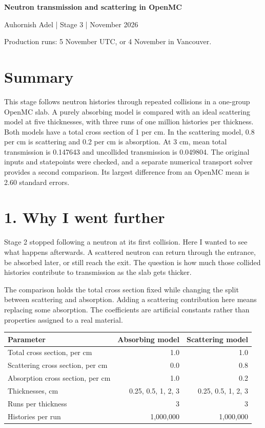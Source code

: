 \documentclass[10pt,letterpaper]{article}
\begin{document}
\begin{center}{\LARGE\bfseries Neutron transmission and scattering in OpenMC}\end{center}

Auhornish Adel | Stage 3 | November 2026


Production runs: 5 November UTC, or 4 November in Vancouver.


\section*{Summary}

This stage follows neutron histories through repeated collisions in a one-group OpenMC slab. A purely absorbing model is compared with an ideal scattering model at five thicknesses, with three runs of one million histories per thickness. Both models have a total cross section of 1 per cm. In the scattering model, 0.8 per cm is scattering and 0.2 per cm is absorption. At 3 cm, mean total transmission is 0.147643 and uncollided transmission is 0.049804. The original inputs and statepoints were checked, and a separate numerical transport solver provides a second comparison. Its largest difference from an OpenMC mean is 2.60 standard errors.


\section*{1. Why I went further}

Stage 2 stopped following a neutron at its first collision. Here I wanted to see what happens afterwards. A scattered neutron can return through the entrance, be absorbed later, or still reach the exit. The question is how much those collided histories contribute to transmission as the slab gets thicker.


The comparison holds the total cross section fixed while changing the split between scattering and absorption. Adding a scattering contribution here means replacing some absorption. The coefficients are artificial constants rather than properties assigned to a real material.


\begin{center}\small
\setlength{\tabcolsep}{5pt}
\renewcommand{\arraystretch}{1.22}
\begin{tabular}{@{}lrr@{}}
\toprule
Parameter & Absorbing model & Scattering model\\
\midrule
Total cross section, per cm & 1.0 & 1.0\\
Scattering cross section, per cm & 0.0 & 0.8\\
Absorption cross section, per cm & 1.0 & 0.2\\
Thicknesses, cm & 0.25, 0.5, 1, 2, 3 & 0.25, 0.5, 1, 2, 3\\
Runs per thickness & 3 & 3\\
Histories per run & 1,000,000 & 1,000,000\\
\bottomrule
\end{tabular}
\end{center}
\end{document}

